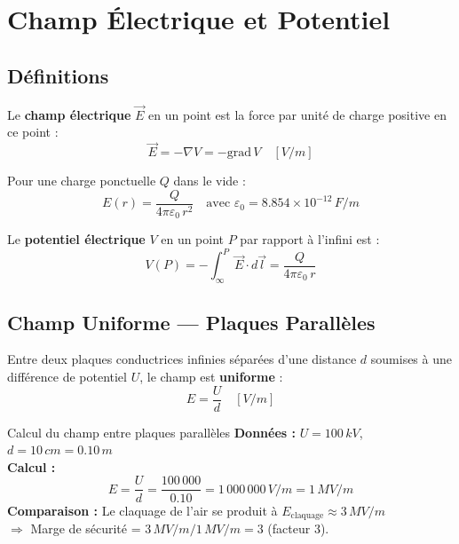 \documentclass[12pt, a4paper, twoside]{report}
\begin{document}
\section{Champ Électrique et Potentiel}

\subsection{Définitions}

Le \textbf{champ électrique} $\vec{E}$ en un point est la force par unité de charge
positive en ce point :
\begin{equation}
  \vec{E} = -\nabla V = -\text{grad}\,V \quad [\si{V/m}]
\end{equation}

Pour une charge ponctuelle $Q$ dans le vide :
\begin{equation}
  E(r) = \frac{Q}{4\pi\varepsilon_0\,r^2} \quad
  \text{avec } \varepsilon_0 = 8.854 \times 10^{-12}\,\si{F/m}
\end{equation}

Le \textbf{potentiel électrique} $V$ en un point $P$ par rapport à l'infini est :
\begin{equation}
  V(P) = -\int_{\infty}^{P} \vec{E}\cdot d\vec{l} = \frac{Q}{4\pi\varepsilon_0\,r}
\end{equation}

\subsection{Champ Uniforme — Plaques Parallèles}

Entre deux plaques conductrices infinies séparées d'une distance $d$ soumises à
une différence de potentiel $U$, le champ est \textbf{uniforme} :
\begin{equation}
  \boxed{E = \frac{U}{d}} \quad [\si{V/m}]
\end{equation}

\begin{exemple}{Calcul du champ entre plaques parallèles}
\textbf{Données :} $U = 100\,\si{kV}$, $d = 10\,\si{cm} = 0.10\,\si{m}$\\[4pt]
\textbf{Calcul :}
\[
  E = \frac{U}{d} = \frac{100\,000}{0.10} = 1\,000\,000\,\si{V/m} = 1\,\si{MV/m}
\]
\textbf{Comparaison :} Le claquage de l'air se produit à $E_{\text{claquage}} \approx 3\,\si{MV/m}$\\
$\Rightarrow$ Marge de sécurité = $3\,\si{MV/m} / 1\,\si{MV/m} = 3$ (facteur 3).
\end{exemple}
\end{document}
